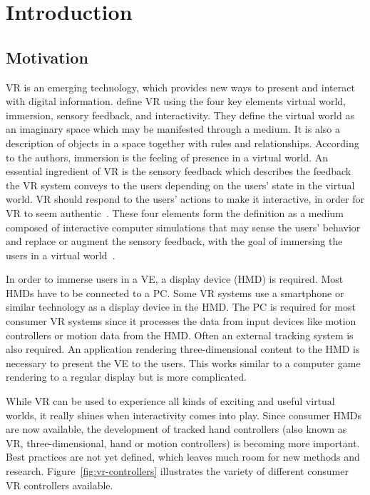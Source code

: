 \chapter{Introduction}\label{chapter:introduction}

\section{Motivation}\label{section:motivation}

\gls{VR} is an emerging technology, which provides new ways to present and interact with digital information. \citeauthor{Sherman.2003} define \gls{VR} using the four key elements virtual world, immersion, sensory feedback, and interactivity. They define the virtual world as an imaginary space which may be manifested through a medium. It is also a description of objects in a space together with rules and relationships. According to the authors, immersion is the feeling of presence in a virtual world. An essential ingredient of \gls{VR} is the sensory feedback which describes the feedback the \gls{VR} system conveys to the users depending on the users' state in the virtual world. %
\gls{VR} should respond to the users' actions to make it interactive, in order for \gls{VR} to seem authentic~\cite[6-13]{Sherman.2003}.
These four elements form the definition as a medium composed of interactive computer simulations that may sense the users' behavior and replace or augment the sensory feedback, with the goal of immersing the users in a virtual world~\cite[13-14]{Sherman.2003}.

In order to immerse users in a \gls{VE}, a display device (\gls{HMD}) is required. Most \glspl{HMD} have to be connected to a \gls{PC}. Some \gls{VR} systems use a smartphone or similar technology as a display device in the \gls{HMD}. The \gls{PC} is required for most consumer \gls{VR} systems since it processes the data from input devices like motion controllers or motion data from the \gls{HMD}. Often an external tracking system is also required. An application rendering three-dimensional content to the \gls{HMD} is necessary to present the \gls{VE} to the users. This works similar to a computer game rendering to a regular display but is more complicated.

While \gls{VR} can be used to experience all kinds of exciting and useful virtual worlds, it really shines when interactivity comes into play. Since consumer \glspl{HMD} are now available, the development of tracked hand controllers (also known as \gls{VR}, three-dimensional, hand or motion controllers) is becoming more important.
Best practices are not yet defined, which leaves much room for new methods and research. Figure~\ref{fig:vr-controllers} illustrates the variety of different consumer \gls{VR} controllers available.

